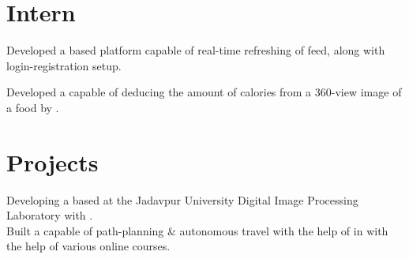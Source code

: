 \documentclass[]{deedy-resume-openfont}
\begin{document}
\hfill
\begin{minipage}[t]{0.66\textwidth}


\section{Intern}
Developed a  based platform capable of real-time refreshing of feed, along with login-registration setup.
\sectionsep

Developed a  capable of deducing the amount of calories from a 360-view image of a food by .
\sectionsep

\section{Projects}

Developing a  based  at the Jadavpur University Digital Image Processing Laboratory with  .\\ 
\sectionsep
{}
Built a  capable of path-planning \& autonomous travel with the help of  in  with the help of various online courses. 
\sectionsep \\


\end{minipage}
\end{document}
